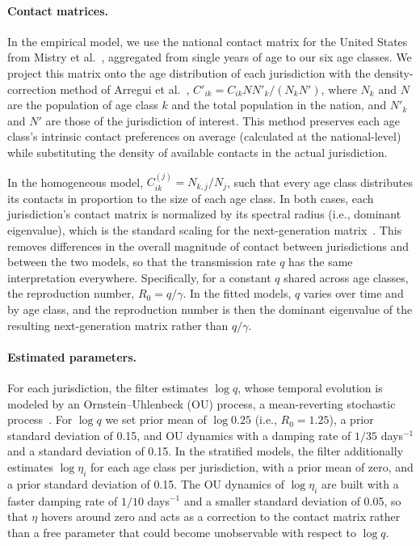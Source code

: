 \paragraph{Contact matrices.} 
In the empirical model, we use the national contact matrix for the United States from Mistry et al.~\citep{mistry_inferring_2021}, aggregated from single years of age to our six age classes. 
We project this matrix onto the age distribution of each jurisdiction with the density-correction method of Arregui et al.~\citep{arregui_projecting_2018}, $C'_{ik} = C_{ik} N N'_k / (N_k N')$, where $N_k$ and $N$ are the population of age class $k$ and the total population in the nation, and $N'_k$ and $N'$ are those of the jurisdiction of interest. 
This method preserves each age class's intrinsic contact preferences on average (calculated at the national-level) while substituting the density of available contacts in the actual jurisdiction. 

In the homogeneous model, $C^{(j)}_{ik} = N_{k,j}/N_j$, such that every age class distributes its contacts in proportion to the size of each age class. 
In both cases, each jurisdiction's contact matrix is normalized by its spectral radius (i.e., dominant eigenvalue), which is the standard scaling for the next-generation matrix~\citep{diekmann_construction_2010}. 
This removes differences in the overall magnitude of contact between jurisdictions and between the two models, so that the transmission rate $q$ has the same interpretation everywhere.
Specifically, for a constant $q$ shared across age classes, the reproduction number, $R_0 = q/\gamma$. 
In the fitted models, $q$ varies over time and by age class, and the reproduction number is then the dominant eigenvalue of the resulting next-generation matrix rather than $q/\gamma$.

\paragraph{Estimated parameters.} 

For each jurisdiction, the filter estimates $\log q$, whose temporal evolution is modeled by an Ornstein–Uhlenbeck (OU) process, a mean-reverting stochastic process~\citep{drennan_estimating_2026}. 
For $\log q$ we set prior mean of $\log 0.25$ (i.e., $R_0 = 1.25$), a prior standard deviation of 0.15, and OU dynamics with a damping rate of $1/35$ days$^{-1}$ and a standard deviation of 0.15. 
In the stratified models, the filter additionally estimates $\log \eta_i$ for each age class per jurisdiction, with a prior mean of zero, and a prior standard deviation of 0.15.
The OU dynamics of $\log \eta_i$ are built with a faster damping rate of $1/10$ days$^{-1}$ and a smaller standard deviation of 0.05, so that $\eta$ hovers around zero and acts as a correction to the contact matrix rather than a free parameter that could become unobservable with respect to $\log q$.

